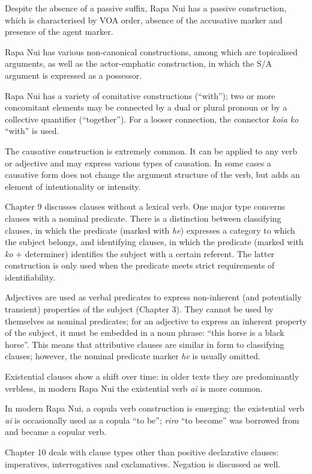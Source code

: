 Despite the absence of a passive suffix, Rapa Nui has a passive construction, which is characterised by VOA order, absence of the accusative marker and presence of the agent marker. 

Rapa Nui has various non-canonical constructions, among which are topicalised arguments, as well as the actor-emphatic construction, in which the S/A argument is expressed as a possessor.

Rapa Nui has a variety of comitative constructions (“with”); two or more concomitant elements may be connected by a dual or plural pronoun or by a collective quantifier (“together”). For a looser connection, the connector \textit{koia ko} “with” is used. 

The causative construction is extremely common. It can be applied to any verb or adjective and may express various types of causation. In some cases a causative form does not change the argument structure of the verb, but adds an element of intentionality or intensity.

\medskip Chapter 9 discusses clauses without a lexical verb. One major type concerns clauses with a nominal predicate. There is a distinction between classifying clauses, in which the predicate (marked with \textit{he}) expresses a category to which the subject belongs, and identifying clauses, in which the predicate (marked with \textit{ko} + determiner) identifies the subject with a certain referent. The latter construction is only used when the predicate meets strict requirements of identifiability.

Adjectives are used as verbal predicates to express non-inherent (and potentially transient) properties of the subject (Chapter 3). They cannot be used by themselves as nominal predicates; for an adjective to express an inherent property of the subject, it must be embedded in a noun phrase: “this horse is a black horse”. This means that attributive clauses are similar in form to classifying clauses; however, the nominal predicate marker \textit{he} is usually omitted.

Existential clauses show a shift over time: in older texts they are predominantly verbless, in modern Rapa Nui the existential verb \textit{ai} is more common. 

In modern Rapa Nui, a copula verb construction is emerging: the existential verb \textit{ai} is occasionally used as a copula “to be”; \textit{riro} “to become” was borrowed from  and became a copular verb.

\medskip Chapter 10 deals with clause types other than positive declarative clauses: imperatives, interrogatives and exclamatives. Negation is discussed as well. 

